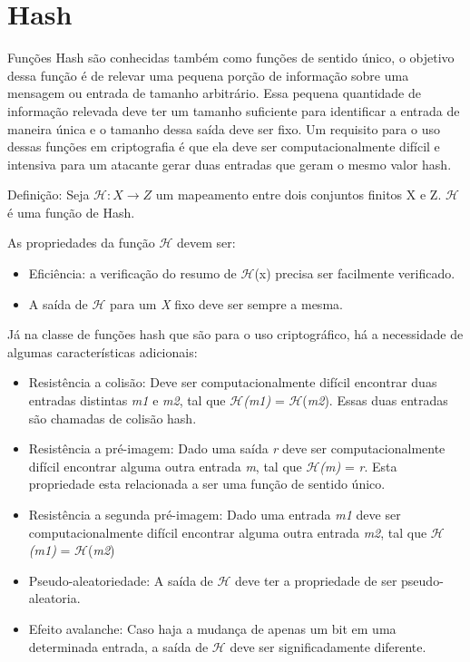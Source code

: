 \documentclass{ufsctex/ufsctex}
\begin{document}
\section{Hash}

Funções Hash são conhecidas também como funções de sentido único, o objetivo
dessa função é de relevar uma pequena porção de informação sobre uma mensagem
ou entrada de tamanho arbitrário.  Essa pequena quantidade de informação
relevada deve ter um tamanho suficiente para identificar a entrada de maneira
única e o tamanho dessa saída deve ser fixo. Um requisito para o uso dessas
funções em criptografia é que ela deve ser computacionalmente difícil e
intensiva para um atacante gerar duas entradas que geram o mesmo valor hash.
\cite{cryptoschool}

Definição: Seja $\mathcal{H} : X \longrightarrow Z$ um mapeamento entre dois
conjuntos finitos X e Z. $\mathcal{H}$  é uma função de Hash.

As propriedades da função $\mathcal{H}$ devem ser:

\begin{itemize}

	\item Eficiência: a verificação do resumo de $\mathcal{H}$(x) precisa ser
	facilmente verificado.
	\item A saída de $\mathcal{H}$ para um \textit{X} fixo deve ser sempre a
		mesma.

\end{itemize}

Já na classe de funções hash que são para o uso criptográfico, há a necessidade
de algumas características adicionais:

\begin{itemize}

	\item Resistência a colisão: Deve ser computacionalmente difícil encontrar
		duas entradas distintas \textit{m1} e \textit{m2}, tal que
		$\mathcal{H}$\textit{(m1)} = $\mathcal{H}$(\textit{m2}). Essas duas
		entradas são chamadas de colisão hash.
	\item Resistência a pré-imagem: Dado uma saída \textit{r} deve ser
		computacionalmente difícil encontrar alguma outra entrada \textit{m},
		tal que $\mathcal{H}$\textit{(m)} = \textit{r}. Esta propriedade esta
		relacionada a ser uma função de sentido único.
	\item Resistência a segunda pré-imagem: Dado uma entrada \textit{m1} deve
		ser computacionalmente difícil encontrar alguma outra entrada
		\textit{m2}, tal que $\mathcal{H}$\textit{(m1)} =
		$\mathcal{H}$(\textit{m2})
	\item Pseudo-aleatoriedade: A saída de $\mathcal{H}$ deve ter a propriedade
		de ser pseudo-aleatoria.
	\item Efeito avalanche: Caso haja a mudança de apenas um bit em uma
		determinada entrada, a saída de $\mathcal{H}$ deve ser significadamente
		diferente.

\end{itemize}
\end{document}
